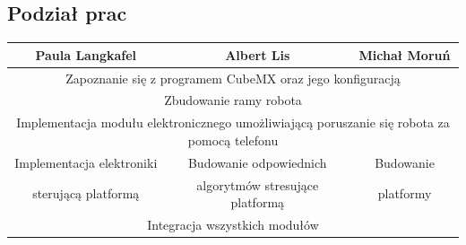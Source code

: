 \documentclass[10pt, a4paper]{article}
\begin{document}
\subsection{Podział prac}
\begin{table}[H]
	\centering
	\begin{tabular}{|c|c|c|}
		\hline
		Paula Langkafel                               & Albert Lis                                             & Michał Moruń        \\ \hline
		\multicolumn{3}{|c|}{Zapoznanie się z programem CubeMX oraz jego konfiguracją}                                               \\ \hline
		\multicolumn{3}{|c|}{Zbudowanie ramy robota}                                                                                 \\ \hline
		\multicolumn{3}{|c|}{Implementacja modułu elektronicznego umożliwiającą poruszanie się robota za pomocą telefonu}            \\ \hline
		Implementacja elektroniki  & Budowanie odpowiednich & Budowanie  \\
		 sterującą platformą & algorytmów stresujące platformą &  platformy  \\ \hline
		\multicolumn{3}{|c|}{Integracja wszystkich modułów}                                                                          \\ \hline
	\end{tabular}
\end{table}
\end{document}
